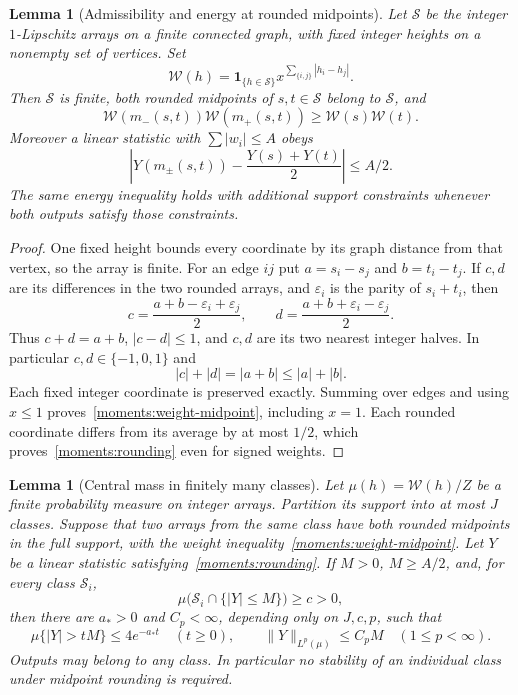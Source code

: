\documentclass[11pt]{article}
\newtheorem{lemma}[theorem]{Lemma}
\theoremstyle{definition}
\theoremstyle{remark}
\numberwithin{equation}{section}
\begin{document}
\begin{lemma}[Admissibility and energy at rounded midpoints]
\label{moments:weighted-midpoints}
Let $\mathcal S$ be the integer $1$-Lipschitz arrays on a finite
connected graph, with fixed integer heights on a nonempty set of
vertices.  Set
\[
 \mathcal W(h)=\mathbf 1_{\{h\in\mathcal S\}}
       x^{\sum_{\{i,j\}}|h_i-h_j|}.
\]
Then $\mathcal S$ is finite, both rounded midpoints of $s,t\in\mathcal S$
belong to $\mathcal S$, and
\begin{equation}\label{moments:weight-midpoint}
 \mathcal W(m_-(s,t))\mathcal W(m_+(s,t))\geq \mathcal W(s)\mathcal W(t).
\end{equation}
Moreover a linear statistic with $\sum|w_i|\leq A$ obeys
\begin{equation}\label{moments:rounding}
 \left|Y(m_\pm(s,t))-\frac{Y(s)+Y(t)}2\right|\leq A/2.
\end{equation}
The same energy inequality holds with additional support constraints
whenever both outputs satisfy those constraints.
\end{lemma}

\begin{proof}
One fixed height bounds every coordinate by its graph distance from
that vertex, so the array is finite.  For an edge $ij$ put
$a=s_i-s_j$ and $b=t_i-t_j$.  If $c,d$ are its differences in the two
rounded arrays, and $\varepsilon_i$ is the parity of $s_i+t_i$, then
\[
 c=\frac{a+b-\varepsilon_i+\varepsilon_j}{2},\qquad
 d=\frac{a+b+\varepsilon_i-\varepsilon_j}{2}.
\]
Thus $c+d=a+b$, $|c-d|\leq1$, and $c,d$ are its two nearest integer
halves.  In particular $c,d\in\{-1,0,1\}$ and
\[
 |c|+|d|=|a+b|\leq|a|+|b|.
\]
Each fixed integer coordinate is preserved exactly.  Summing over edges
and using $x\leq1$ proves~\eqref{moments:weight-midpoint}, including
$x=1$.  Each rounded coordinate differs from its average by at most
$1/2$, which proves~\eqref{moments:rounding} even for signed weights.
\end{proof}

\begin{lemma}[Central mass in finitely many classes]
\label{lem:midpoint-amplification}
Let $\mu(h)=\mathcal W(h)/Z$ be a finite probability measure on integer arrays.
Partition its support into at most $J$ classes.  Suppose that two arrays
from the same class have both rounded midpoints in the full support,
with the weight inequality~\eqref{moments:weight-midpoint}.  Let $Y$ be
a linear statistic satisfying~\eqref{moments:rounding}.  If $M>0$,
$M\geq A/2$, and, for every class $\mathcal S_i$,
\begin{equation}\label{moments:class-central}
 \mu\bigl(\mathcal S_i\cap\{|Y|\leq M\}\bigr)\geq c>0,
\end{equation}
then there are $a_*>0$ and $C_p<\infty$, depending only on $J,c,p$, such
that
\begin{equation}\label{moments:amplification}
 \mu\{|Y|>tM\}\leq4e^{-a_*t}\quad(t\geq0),
 \qquad \|Y\|_{L^p(\mu)}\leq C_pM\quad(1\leq p<\infty).
\end{equation}
Outputs may belong to any class.  In particular no stability of an
individual class under midpoint rounding is required.
\end{lemma}
\end{document}
